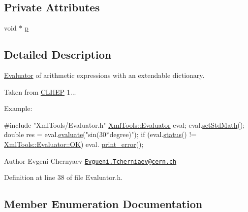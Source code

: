 \subsection*{Private Attributes}
\begin{DoxyCompactItemize}
\item 
void $\ast$ \hyperlink{class_xml_tools_1_1_evaluator_aa7c19df1b96202c09024f7b7f4942364}{p}
\end{DoxyCompactItemize}


\subsection{Detailed Description}
\hyperlink{class_xml_tools_1_1_evaluator}{Evaluator} of arithmetic expressions with an extendable dictionary. 

Taken from \hyperlink{namespace_c_l_h_e_p}{C\+L\+H\+EP} 1...

Example\+: 
\begin{DoxyCode}
\textcolor{preprocessor}{#include "XmlTools/Evaluator.h"}
\hyperlink{class_xml_tools_1_1_evaluator}{XmlTools::Evaluator} eval;
eval.\hyperlink{class_xml_tools_1_1_evaluator_a5df1e3d20d6e6d9150378544d95e86b6}{setStdMath}();
\textcolor{keywordtype}{double} res = eval.\hyperlink{class_xml_tools_1_1_evaluator_a602611e00d06e6fa2b8c5a1b292c2747}{evaluate}(\textcolor{stringliteral}{"sin(30*degree)"});
\textcolor{keywordflow}{if} (eval.\hyperlink{class_xml_tools_1_1_evaluator_af9265974643b0e1b1411ef5cea2b8580}{status}() != \hyperlink{class_xml_tools_1_1_evaluator_a83556834c4fd68f4836782936cc29a6ba22108999c735ca50a4990bb9044ca164}{XmlTools::Evaluator::OK}) eval.
      \hyperlink{class_xml_tools_1_1_evaluator_a35b8445b51d7c045e4027aa55e1ddcae}{print\_error}();
\end{DoxyCode}


\begin{DoxyAuthor}{Author}
Evgeni Chernyaev \href{mailto:Evgueni.Tcherniaev@cern.ch}{\tt Evgueni.\+Tcherniaev@cern.\+ch} 
\end{DoxyAuthor}


Definition at line 38 of file Evaluator.\+h.



\subsection{Member Enumeration Documentation}
\hypertarget{class_xml_tools_1_1_evaluator_a83556834c4fd68f4836782936cc29a6b}{}\label{class_xml_tools_1_1_evaluator_a83556834c4fd68f4836782936cc29a6b} 

